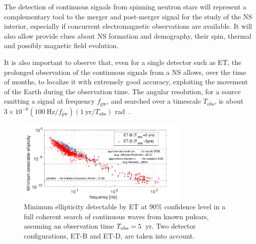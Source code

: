 The detection of continuous signals from spinning neutron stars will represent a complementary tool to the merger and post-merger signal for the study of the NS interior, especially if concurrent electromagnetic observations are available. It will also allow provide clues about NS formation and demography, their spin, thermal and possibly magnetic field evolution.  

It is also important to observe that, even for a single detector such as ET, the prolonged observation of the continuous signals from a NS allows, over the time of months, to localize it with extremely good accuracy, exploiting the movement of the Earth during the observation time. The angular resolution, for a source emitting a signal at frequency $f_\text{gw}$, and searched over a timescale $T_\text{obs}$, is about $3\times 10^{-6}\left(100~\text{Hz}/f_\text{gw}\right)\left(1~\text{yr}/T_\text{obs}\right)$ rad~\cite{Astone:2014esa}.

\begin{figure}[t]
\centering
\includegraphics[width=0.75\textwidth]{Figures/ET_eps-eps-converted-to.pdf}
\caption{Minimum ellipticity detectable by ET at 90$\%$ confidence level in a full coherent search of continuous waves from known pulsars, assuming an observation time $T_{\rm obs}=5$~yr. Two detector configurations, ET-B and ET-D, are taken into account. 
}
\label{fig:eps_vs_dist}
\end{figure} 

